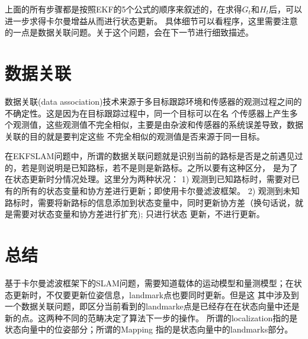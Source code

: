 \documentclass[UTF8,a4paper,10pt]{ctexart}
\begin{document}
上面的所有步骤都是按照EKF的5个公式的顺序来叙述的，在求得$G_t$和$H_t$后，可以进一步求得卡尔曼增益从而进行状态更新。
具体细节可以看程序，这里需要注意的一点是数据关联问题。关于这个问题，会在下一节进行细致描述。

\section{数据关联}

数据关联(data association)技术来源于多目标跟踪环境和传感器的观测过程之间的不确定性。这是因为在目标跟踪过程中，同一个目标可以在名
个传感器上产生多个观测值，这些观测值不完全相似，主要是由杂波和传感器的系统误差导致，数据关联的目的就是要判定这些
不完全相似的观测值是否来源于同一目标。

在EKFSLAM问题中，所谓的数据关联问题就是识别当前的路标是否是之前遇见过的，若是则说明是已知路标，若不是则是新路标。之所以要有这种区分，
是为了在状态更新时分情况处理。这里分为两种状况：
1) 观测到已知路标时，需要对已有的所有的状态变量和协方差进行更新；即使用卡尔曼滤波框架。
2) 观测到未知路标时，需要将新路标的信息添加到状态变量中，同时更新协方差（换句话说，就是需要对状态变量和协方差进行扩充); 只进行状态
更新，不进行更新。

\section{总结}
基于卡尔曼滤波框架下的SLAM问题，需要知道载体的运动模型和量测模型；在状态更新时，不仅要更新位姿信息，landmark点也要同时更新。但是这
其中涉及到一个数据关联问题，即区分当前看到的landmarke点是已经存在在状态向量中还是新的点。这两种不同的范畴决定了算法下一步的操作。
所谓的localization指的是状态向量中的位姿部分；所谓的Mapping 指的是状态向量中的landmarks部分。
\end{document}
